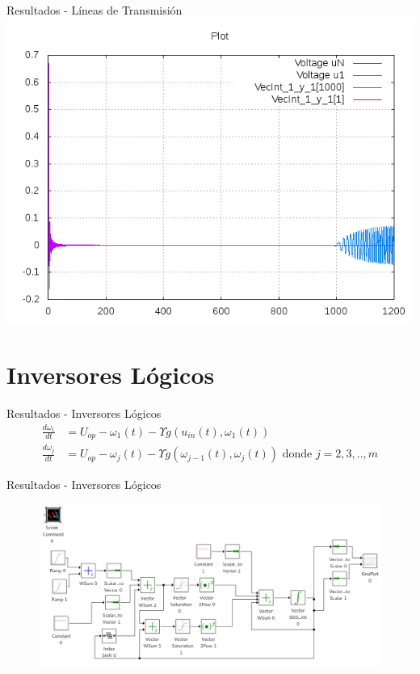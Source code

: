 \documentclass{beamer}
\begin{document}
\begin{frame}{Resultados - Líneas de Transmisión}
 \includegraphics[width=\linewidth]{output/lcline/lcline-all}
\end{frame}


\section{Inversores Lógicos}
\begin{frame}{Resultados - Inversores Lógicos}
\begin{align*}
\frac{d \omega_1}{d t} & = U_{op} - \omega_1(t) - \Upsilon g (u_{in}(t), \omega_{1} (t))    \\
\frac{d \omega_j}{d t} & = U_{op} - \omega_j(t) - \Upsilon g (\omega_{j-1}(t), \omega_{j} (t)) \textrm{ donde $j = 2, 3, .., m$}
\end{align*}
\end{frame}

\begin{frame}{Resultados - Inversores Lógicos}
\begin{figure}[H]
\includegraphics[width=\linewidth]{inverters}
\end{figure}
\end{frame}
\end{document}
